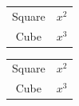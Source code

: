 \documentclass[a4paper,12pt]{article}
\begin{document}
\begin{center}
\renewcommand{\arraystretch}{1.5}
\begin{tabular}{cc}
\hline
Square & $x^2$ \\
Cube & $x^3$ \\
\hline
\end{tabular}
\end{center}

\begin{center}
\setlength{\extrarowheight}{2pt}
\begin{tabular}{cc}
\hline
Square & $x^2$ \\
Cube & $x^3$ \\
\hline
\end{tabular}
\end{center}
\end{document}
